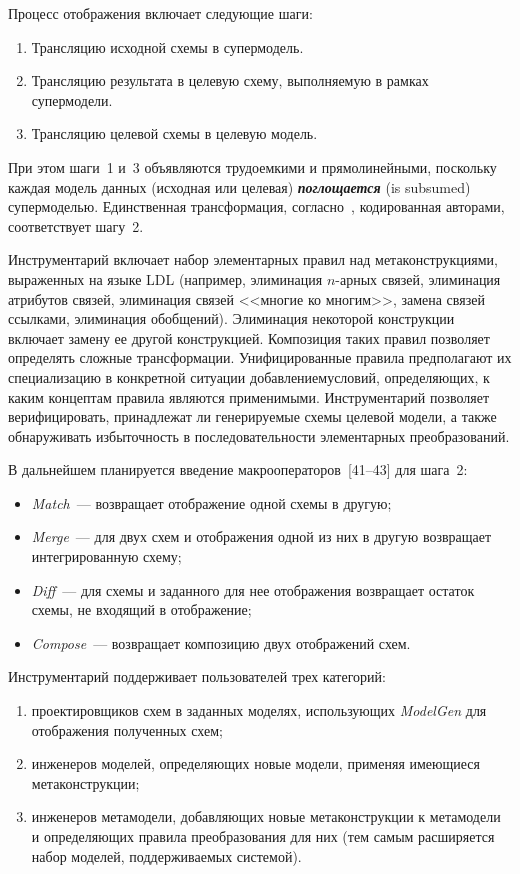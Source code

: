 \begin{multicols}{2}
Процесс отображения включает следующие \mbox{шаги:}
\begin{enumerate}[1.]
\item Трансляцию исходной схемы в супермодель.
\item Трансляцию результата в целевую схему, выполняемую в рамках супермодели.
\item Трансляцию целевой схемы в целевую модель.
\end{enumerate}
При этом шаги~1 и~3 объявляются трудоемкими %
и прямолинейными, поскольку каждая модель %
данных (исходная или целевая)
{\bfseries\textit{поглощается}} (is \mbox{subsumed}) супермоделью. Единственная
трансформация, согласно~\cite{At05}, кодированная авторами, %
соответствует
шагу~2.

Инструментарий включает набор элементарных правил над
метаконструкциями, выраженных на языке LDL (например, элиминация
$n$-арных связей, элиминация атрибутов связей, элиминация связей
<<многие ко многим>>, замена связей ссылками,
элиминация обобщений). Элиминация
некоторой конструкции включает замену ее другой конструкцией.
Композиция таких правил позволяет определять сложные трансформации.
Уни\-фицированные правила предполагают их специализацию в конкретной
ситуации добавлением\linebreak условий, определяющих, к каким концептам правила
являются применимыми. Инструментарий позволяет верифицировать,
принадлежат ли генерируемые схемы целевой модели, а также обнаруживать
избыточность в последовательности элементарных преобразований.

В дальнейшем планируется введение макрооператоров~[41--43]
для шага~2:
 \begin{itemize}
\item {\em Match}~--- возвращает отображение одной схемы в другую;
\item {\em Merge}~--- для двух схем и отображения одной из них в
другую возвращает интегрированную схему;
\item {\em Diff}~--- для схемы и заданного для нее отображения
возвращает остаток схемы, не входящий в отображение;
\item {\em Compose}~--- возвращает композицию двух отоб\-ра\-же\-ний схем.
\end{itemize}

Инструментарий поддерживает пользователей трех категорий:
 \begin{enumerate}[(1)]
\item проектировщиков схем в заданных моделях,
использующих {\it ModelGen} для отображения полученных схем;
\item инженеров моделей, определяющих новые модели, применяя имеющиеся
метаконструкции;
\item инженеров метамодели, добавляющих новые метаконструкции к
метамодели и опреде\-ля\-ющих правила преобразования для них (тем самым
расширяется набор моделей, поддерживаемых системой).
\end{enumerate}


\end{multicols}
